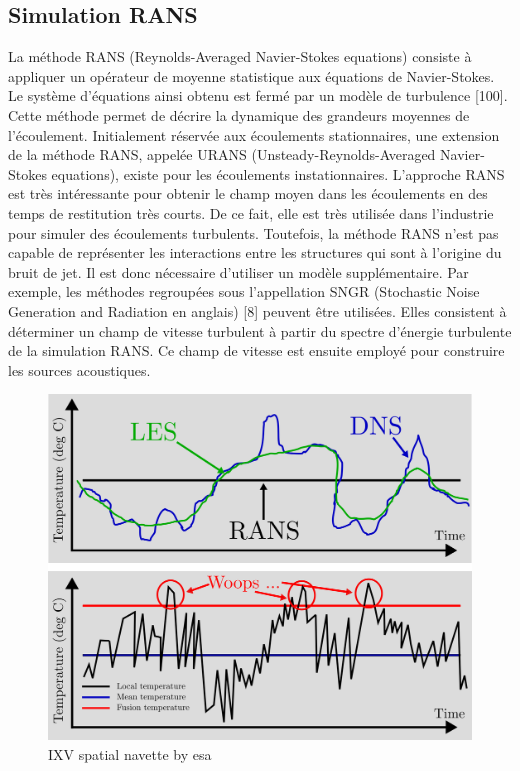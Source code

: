 \subsection{Simulation RANS}

La méthode RANS (Reynolds-Averaged Navier-Stokes equations) consiste à appliquer un opérateur de moyenne statistique aux équations de Navier-Stokes. Le système d'équations ainsi obtenu est fermé par un modèle de turbulence [100]. Cette méthode permet de décrire la dynamique des grandeurs moyennes de l'écoulement. Initialement réservée aux écoulements stationnaires, une extension de la méthode RANS, appelée URANS (Unsteady-Reynolds-Averaged Navier-Stokes equations), existe pour les écoulements instationnaires. L'approche RANS est très intéressante pour obtenir le champ moyen dans les écoulements en des temps de restitution très courts. De ce fait, elle est très utilisée dans l'industrie pour simuler des écoulements turbulents. Toutefois, la méthode RANS n'est pas capable de représenter les interactions entre les structures qui sont à l'origine du bruit de jet. Il est donc nécessaire d'utiliser un modèle supplémentaire. Par exemple, les méthodes regroupées sous l'appellation SNGR (Stochastic Noise Generation and Radiation en anglais) [8] peuvent être utilisées. Elles consistent à déterminer un champ de vitesse turbulent à partir du spectre d'énergie turbulente de la simulation RANS. Ce champ de vitesse est ensuite employé pour construire les sources acoustiques.

\begin{figure}[h!]
 \centering
 \includegraphics[width=1.0\linewidth]{chapter1_introduction/pictures/les_rans_dns.png}
 \vspace{-2ex}
 \caption{IXV spatial navette by esa}
  \vspace{2ex}
 \label{rans}
\end{figure}
